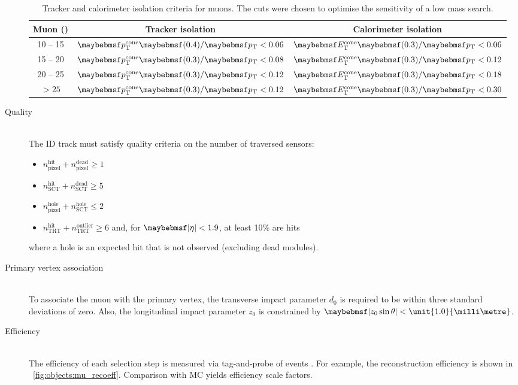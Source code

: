 \begin{description}
	\begin{table}[t]
		\begin{tabular}{c@{\hskip 0.3in}c@{\hskip 0.3in}c}
			\toprule
			Muon \pt (\GeV) & Tracker isolation & Calorimeter isolation \\
			\midrule
			10 -- 15 & $\ptcone{0.4}/\pt < 0.06$ & $\etcone{0.3}/\pt < 0.06$ \\
			15 -- 20 & $\ptcone{0.3}/\pt < 0.08$ & $\etcone{0.3}/\pt < 0.12$ \\
			20 -- 25 & $\ptcone{0.3}/\pt < 0.12$ & $\etcone{0.3}/\pt < 0.18$ \\
			$> 25$   & $\ptcone{0.3}/\pt < 0.12$ & $\etcone{0.3}/\pt < 0.30$ \\
			\bottomrule
		\end{tabular}
		\caption{Tracker and calorimeter isolation criteria for muons. The cuts were 
		chosen to optimise the sensitivity of a low mass \HWWlvlv search.}
		\label{tab:objects:mu_iso}
	\end{table}

\item[Quality] \hfill \\
	The ID track must satisfy quality criteria on the number of traversed sensors:
	\begin{itemize}[noitemsep,nolistsep]
		\item $n_{\text{pixel}}^{\text{hit}} + n_{\text{pixel}}^{\text{dead}} \geq 1$
		\item $n_{\text{SCT}}^{\text{hit}} + n_{\text{SCT}}^{\text{dead}} \geq 5$
		\item $n_{\text{pixel}}^{\text{hole}} + n_{\text{SCT}}^{\text{hole}} \leq 2$
		\item $n_{\text{TRT}}^{\text{hit}} + n_{\text{TRT}}^{\text{outlier}} \geq 6$ and, 
		for $\mods{\eta} < 1.9$, at least 10\% are hits
	\end{itemize}
	where a hole is an expected hit that is not observed (excluding dead modules).

\item[Primary vertex association] \hfill \\
	To associate the muon with the primary vertex, the transverse impact parameter $d_0$ 
	is required to be within three standard deviations of zero. Also, the longitudinal 
	impact parameter $z_0$ is constrained by $\mods{z_0 \sin\theta} < 
	\unit{1.0}{\milli\metre}$.

\item[Efficiency] \hfill \\
	The efficiency of each selection step is measured via tag-and-probe of 
	\HepProcess{\PZ \HepTo \Pmu\Pmu} events \cite{Muons:2012}. For example, the 
	reconstruction efficiency is shown in \Figure~\ref{fig:objects:mu_recoeff}. 
	Comparison with MC yields efficiency scale factors.


\end{description}
